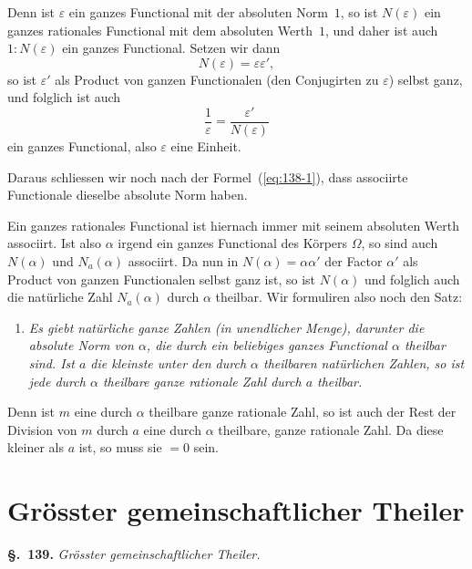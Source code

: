 \documentclass[12pt,a4paper]{article}
\theoremstyle{definition}
\begin{document}
Denn ist $\varepsilon$ ein ganzes Functional mit der absoluten Norm~$1$, so ist $N(\varepsilon)$ ein ganzes rationales Functional mit dem absoluten Werth~$1$, und daher ist auch $1:N(\varepsilon)$ ein ganzes Functional. Setzen wir dann
\[
N(\varepsilon) = \varepsilon\varepsilon',
\]
so ist $\varepsilon'$ als Product von ganzen Functionalen (den Conjugirten zu $\varepsilon$) selbst ganz, und folglich ist auch
\[
\frac{1}{\varepsilon} = \frac{\varepsilon'}{N(\varepsilon)}
\]
ein ganzes Functional, also $\varepsilon$ eine Einheit.

\newpage

Daraus schliessen wir noch nach der Formel~(\ref{eq:138-1}), dass associirte Functionale dieselbe absolute Norm haben.

Ein ganzes rationales Functional ist hiernach immer mit seinem absoluten Werth associirt. Ist also $\alpha$ irgend ein ganzes Functional des Körpers $\Omega$, so sind auch $N(\alpha)$ und $N_a(\alpha)$ associirt. Da nun in $N(\alpha)=\alpha\alpha'$ der Factor $\alpha'$ als Product von ganzen Functionalen selbst ganz ist, so ist $N(\alpha)$ und folglich auch die natürliche Zahl $N_a(\alpha)$ durch $\alpha$ theilbar. Wir formuliren also noch den Satz:

\begin{enumerate}[label=\arabic*., resume]
\item \textit{Es giebt natürliche ganze Zahlen (in unendlicher Menge), darunter die absolute Norm von $\alpha$, die durch ein beliebiges ganzes Functional $\alpha$ theilbar sind. Ist $a$ die kleinste unter den durch $\alpha$ theilbaren natürlichen Zahlen, so ist jede durch $\alpha$ theilbare ganze rationale Zahl durch $a$ theilbar.}
\end{enumerate}

Denn ist $m$ eine durch $\alpha$ theilbare ganze rationale Zahl, so ist auch der Rest der Division von $m$ durch $a$ eine durch $\alpha$ theilbare, ganze rationale Zahl. Da diese kleiner als $a$ ist, so muss sie $=0$ sein.

\newpage
\section{Grösster gemeinschaftlicher Theiler}\label{sec:139}

\noindent\textbf{\S.~139.}\quad
\textit{Grösster gemeinschaftlicher Theiler.}\par\medskip
\end{document}
